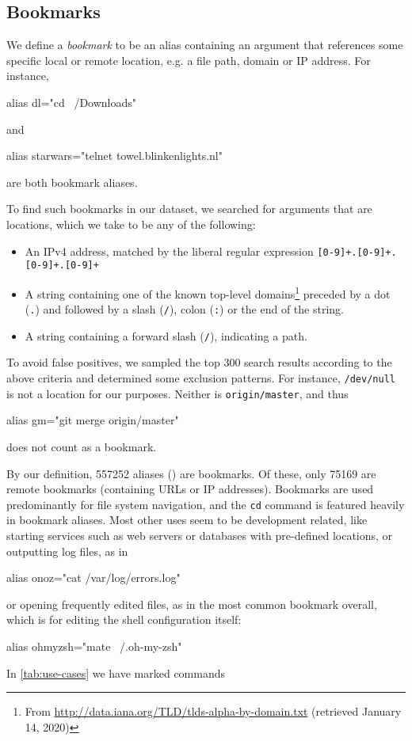 \subsection{Bookmarks}

We define a \emph{bookmark} to be an alias containing an argument that references some specific local or remote location, e.g. a file path, domain or IP address.
For instance, 
\begin{CVerbatim}
alias dl="cd ~/Downloads"
\end{CVerbatim}
and
\begin{CVerbatim}
alias starwars="telnet towel.blinkenlights.nl"
\end{CVerbatim}
are both bookmark aliases.

To find such bookmarks in our dataset, we searched for arguments that are locations, which we take to be any of the following:
\begin{itemize}
    \item An IPv4 address, matched by the liberal regular expression \verb|[0-9]+.[0-9]+.[0-9]+.[0-9]+|
    \item A string containing one of the known top-level domains\footnote{From \url{http://data.iana.org/TLD/tlds-alpha-by-domain.txt} (retrieved January 14, 2020)} preceded by a dot (\verb|.|) and followed by a slash (\verb|/|), colon (\verb|:|) or the end of the string.
    \item A string containing a forward slash (\verb|/|), indicating a path.
\end{itemize}
To avoid false positives, we sampled the top 300 search results according to the above criteria and determined some exclusion patterns.
For instance, \texttt{/dev/null} is not a location for our purposes.
Neither is \texttt{origin/master}, and thus 
\begin{CVerbatim}
alias gm="git merge origin/master"
\end{CVerbatim}
does not count as a bookmark.

By our definition, \num{557252} aliases () are bookmarks.
Of these, only \num{75169} are remote bookmarks (containing URLs or IP addresses).
Bookmarks are used predominantly for file system navigation, and the \texttt{cd} command is featured heavily in bookmark aliases.
Most other uses seem to be development related, like starting services such as web servers or databases with pre-defined locations, or outputting log files, as in 
\begin{CVerbatim}
alias onoz="cat /var/log/errors.log"
\end{CVerbatim}
or opening frequently edited files, as in the most common bookmark overall, which is for editing the shell configuration itself:
\begin{CVerbatim}
alias ohmyzsh="mate ~/.oh-my-zsh"
\end{CVerbatim}

In \cref{tab:use-cases} we have marked commands 

